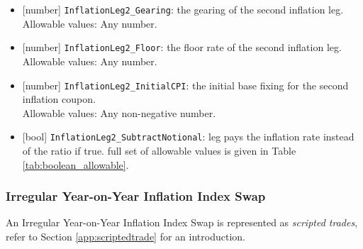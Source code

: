 \begin{itemize}
  \item{}[number] \lstinline!InflationLeg2_Gearing!:  the gearing of the second inflation leg. \\
  Allowable values: Any number.
  \item{}[number] \lstinline!InflationLeg2_Floor!:  the floor rate of the second inflation leg. \\
  Allowable values: Any number.
  \item{}[number] \lstinline!InflationLeg2_InitialCPI!: the initial base fixing for the second inflation coupon. \\
  Allowable values: Any non-negative number.
  \item{}[bool] \lstinline!InflationLeg2_SubtractNotional!: leg pays the inflation rate instead of the ratio if true.
  full set of allowable values is given in Table \ref{tab:boolean_allowable}.
\end{itemize}

\subsubsection{Irregular Year-on-Year Inflation Index Swap}


An Irregular Year-on-Year Inflation Index Swap is represented as {\em scripted trades}, refer to Section
\ref{app:scriptedtrade} for an introduction.

